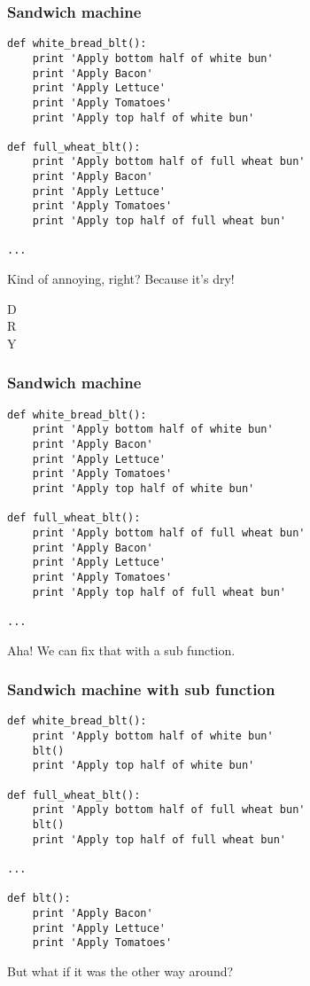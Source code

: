 \documentclass{beamer}
\begin{document}
\begin{frame}[fragile]
  \frametitle{Sandwich machine}
\begin{verbatim}
def white_bread_blt():
    print 'Apply bottom half of white bun'
    print 'Apply Bacon'
    print 'Apply Lettuce'
    print 'Apply Tomatoes'
    print 'Apply top half of white bun'

def full_wheat_blt():
    print 'Apply bottom half of full wheat bun'
    print 'Apply Bacon'
    print 'Apply Lettuce'
    print 'Apply Tomatoes'
    print 'Apply top half of full wheat bun'

...
\end{verbatim}
\pause
Kind of annoying, right? \pause Because it's dry!
\end{frame}

\begin{frame}
  \Huge{}
  {\color{blue}D}\\
  {\color{blue}R}\\
  {\color{blue}Y}\\
  \normalsize{}
\end{frame}

\begin{frame}[fragile]
  \frametitle{Sandwich machine}
\begin{verbatim}
def white_bread_blt():
    print 'Apply bottom half of white bun'
    print 'Apply Bacon'
    print 'Apply Lettuce'
    print 'Apply Tomatoes'
    print 'Apply top half of white bun'

def full_wheat_blt():
    print 'Apply bottom half of full wheat bun'
    print 'Apply Bacon'
    print 'Apply Lettuce'
    print 'Apply Tomatoes'
    print 'Apply top half of full wheat bun'

...
\end{verbatim}
\pause Aha! We can fix that with a sub function.
\end{frame}

\begin{frame}[fragile]
  \frametitle{Sandwich machine with sub function}
\begin{verbatim}
def white_bread_blt():
    print 'Apply bottom half of white bun'
    blt()
    print 'Apply top half of white bun'

def full_wheat_blt():
    print 'Apply bottom half of full wheat bun'
    blt()
    print 'Apply top half of full wheat bun'

...

def blt():
    print 'Apply Bacon'
    print 'Apply Lettuce'
    print 'Apply Tomatoes'
\end{verbatim}
\pause
But what if it was the other way around?
\end{frame}
\end{document}
